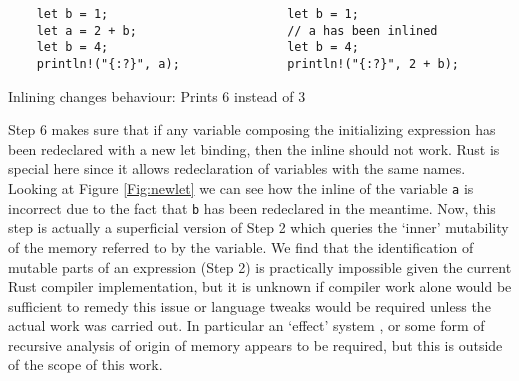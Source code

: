 \begin{fig}[H]
\begin{verbatim}
    let b = 1;                         let b = 1;
    let a = 2 + b;                     // a has been inlined
    let b = 4;                         let b = 4;
    println!("{:?}", a);               println!("{:?}", 2 + b);
\end{verbatim}
\caption{Inlining changes behaviour: Prints 6 instead of 3}
\label{Fig:newlet}
\end{fig}

Step 6 makes sure that if any variable composing the initializing expression has been redeclared with a new let binding, then the inline should not work. Rust is special here since it allows redeclaration of variables with the same names. Looking at Figure \ref{Fig:newlet} we can see how the inline of the variable {\verb|a|} is incorrect due to the fact that {\verb|b|} has been redeclared in the meantime. Now, this step is actually a superficial version of Step 2 which queries the `inner' mutability of the memory referred to by the variable. We find that the identification of mutable parts of an expression (Step 2) is practically impossible given the current Rust compiler implementation, but it is unknown if compiler work alone would be sufficient to remedy this issue or language tweaks would be required unless the actual work was carried out. In particular an `effect' system \cite{effects}, or some form of recursive analysis of origin of memory appears to be required, but this is outside of the scope of this work.





